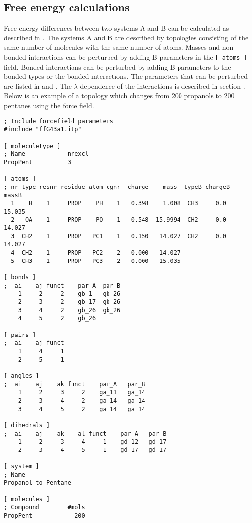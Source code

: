 \subsection{Free energy calculations}
Free energy differences between two systems A and B can be calculated as
described in .
The systems A and B are described by topologies
consisting of the same number of molecules with the same number of
atoms. Masses and non-bonded interactions can be perturbed by adding B
parameters in the {\tt [~atoms~]} field. Bonded interactions can be 
perturbed by adding B parameters to the bonded types or the bonded
interactions. The parameters that can be perturbed are listed in  
 and .
The $\lambda$-dependence of the interactions is described
in section .
Below is an example of a topology which changes from 200 propanols to
200 pentanes using the  force field.
{\small\begin{verbatim}
; Include forcefield parameters
#include "ffG43a1.itp"

[ moleculetype ]
; Name            nrexcl
PropPent          3

[ atoms ]
; nr type resnr residue atom cgnr  charge    mass  typeB chargeB  massB
  1    H    1     PROP    PH    1   0.398    1.008  CH3     0.0  15.035
  2   OA    1     PROP    PO    1  -0.548  15.9994  CH2     0.0  14.027
  3  CH2    1     PROP   PC1    1   0.150   14.027  CH2     0.0  14.027
  4  CH2    1     PROP   PC2    2   0.000   14.027
  5  CH3    1     PROP   PC3    2   0.000   15.035

[ bonds ]
;  ai    aj funct    par_A  par_B 
    1     2     2    gb_1   gb_26
    2     3     2    gb_17  gb_26
    3     4     2    gb_26  gb_26
    4     5     2    gb_26

[ pairs ]
;  ai    aj funct
    1     4     1
    2     5     1

[ angles ]
;  ai    aj    ak funct    par_A   par_B
    1     2     3     2    ga_11   ga_14
    2     3     4     2    ga_14   ga_14
    3     4     5     2    ga_14   ga_14

[ dihedrals ]
;  ai    aj    ak    al funct    par_A   par_B
    1     2     3     4     1    gd_12   gd_17
    2     3     4     5     1    gd_17   gd_17

[ system ]
; Name
Propanol to Pentane

[ molecules ]
; Compound        #mols
PropPent            200
\end{verbatim}}
